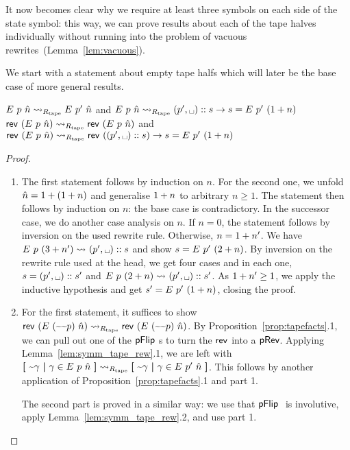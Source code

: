 \begin{remark}
  It now becomes clear why we require at least three symbols on each side of the state symbol: this way, we can prove results about each of the tape halves individually without running into the problem of vacuous rewrites~(Lemma~\ref{lem:vacuous}). 
\end{remark}

We start with a statement about empty tape halfs which will later be the base case of more general results.
\begin{lemma}\label{lem:nilstr_blank}\leavevmode
  \begin{enumerate}
     $E~p~\hat{n} \rightsquigarrow_{R_{\text{tape}}} E~p'~\hat{n}$ and $\nilstr{p}{\hat{n}} \strent{\Rtape} (p', \blank) :: s \rightarrow s = \nilstr{p'}{(\natS{n})}$
     $\mathsf{rev}~{(E~p~\hat{n})} \rightsquigarrow_{R_{\text{tape}}} \mathsf{rev}~{(E~p~\hat{n})}$ and $\rev~{(\nilstr{p}{\hat{n}})} \strent{\Rtape} \rev~{((p', \blank) :: s)} \rightarrow s = \nilstr{p'}{(\natS{n})}$
  \end{enumerate}
\end{lemma}
\begin{proof}
  \begin{enumerate}
    \item The first statement follows by induction on $n$. For the second one, we unfold $\hat{n} = 1 +{(1 +{n})}$ and generalise $1 +{n}$ to arbitrary $n \ge 1$. The statement then follows by induction on $n$: the base case is contradictory. In the successor case, we do another case analysis on $n$. If $n =0$, the statement follows by inversion on the used rewrite rule. 
      Otherwise, $n = 1 +{n'}$. We have $\nilstr{p}{(3+n')} \strent{} (p', \blank) :: s$ and show $s = E~p'~(2 + n)$. By inversion on the rewrite rule used at the head, we get four cases and in each one, $s = (p', \blank) :: s'$ and $\nilstr{p}{(2+n)} \strent{} (p', \blank) :: s'$. As $1 +{n'} \ge 1$, we apply the inductive hypothesis and get $s' = E~p'~(1 +{n})$, closing the proof. 
    \item For the first statement, it suffices to show $\mathsf{rev}~{(E~(\text{\textasciitilde}\text{\textasciitilde}p)~\hat{n})} \rightsquigarrow_{R_{\text{tape}}} \mathsf{rev}~{(E~(\text{\textasciitilde}\text{\textasciitilde}p)~\hat{n})}$. By Proposition~\ref{prop:tapefacts}.1, we can pull out one of the $\pFlip$s to turn the $\mathsf{rev}$ into a $\textsf{pRev}$. Applying Lemma~\ref{lem:symm_tape_rew}.1, we are left with $\textbf{[}~ \text{\textasciitilde}\gamma ~\textbf{|}~ \gamma \in E~p~\hat{n} ~\textbf{]} \rightsquigarrow_{R_{\text{tape}}} \textbf{[}~ \text{\textasciitilde}\gamma ~\textbf{|}~ \gamma \in E~p'~\hat{n} ~\textbf{]}$. This follows by another application of Proposition~\ref{prop:tapefacts}.1 and part 1. 

      The second part is proved in a similar way: we use that $\pFlip$ is involutive, apply Lemma~\ref{lem:symm_tape_rew}.2, and use part 1.
  \end{enumerate}
\end{proof}


